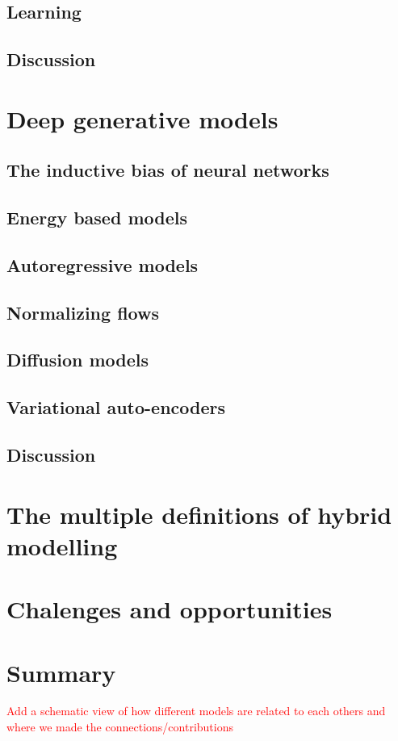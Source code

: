 \subsection{Learning}

\subsection{Discussion}

\section{Deep generative models}
\subsection{The inductive bias of neural networks}
\subsection{Energy based models}
\subsection{Autoregressive models}
\subsection{Normalizing flows}
\subsection{Diffusion models}
\subsection{Variational auto-encoders}
\subsection{Discussion}

\section{The multiple definitions of hybrid modelling}

\section{Chalenges and opportunities}

\section{Summary}

\textcolor{red}{Add a schematic view of how different models are related to each others and where we made the connections/contributions}
